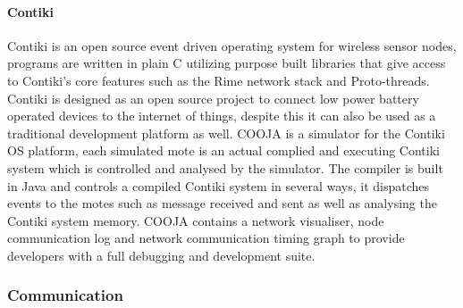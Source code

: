 \paragraph{Contiki} Contiki is an open source event driven operating system for wireless sensor nodes, programs are written in plain C utilizing purpose built libraries that give access to Contiki's core features such as the Rime network stack and Proto-threads\cite{?}. Contiki is designed as an open source project to connect low power battery operated devices to the internet of things\cite{?}, despite this it can also be used as a traditional development platform as well. COOJA is a simulator for the Contiki OS platform, each simulated mote is an actual complied and executing Contiki system which is controlled and analysed by the simulator. The compiler is built in Java and controls a compiled Contiki system in several ways, it dispatches events to the motes such as message received and sent as well as analysing the Contiki system memory. COOJA contains a network visualiser, node communication log and network communication timing graph to provide developers with a full debugging and development suite.

\subsubsection{Communication}

